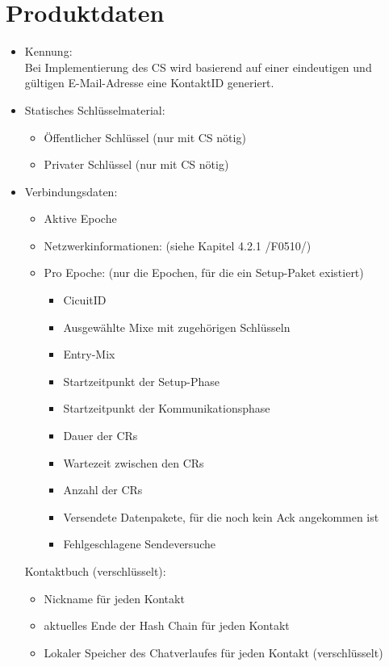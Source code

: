 \section{Produktdaten}
\begin{itemize}
	
	\item Kennung:\\
		Bei Implementierung des \ac{CS} wird basierend auf einer eindeutigen und gültigen E-Mail-Adresse eine KontaktID generiert.
	\item Statisches Schlüsselmaterial:  
	\begin{itemize}
		\item Öffentlicher Schlüssel	(nur mit \ac{CS} nötig)
		\item Privater Schlüssel		(nur mit \ac{CS} nötig)
	\end{itemize}
	\item Verbindungsdaten:
	\begin{itemize}
		\item Aktive Epoche
		\item Netzwerkinformationen:	(siehe Kapitel 4.2.1 /F0510/)
		\item Pro Epoche:	(nur die Epochen, für die ein Setup-Paket existiert)
		\begin{itemize}
			\item CicuitID
			\item Ausgewählte Mixe mit zugehörigen Schlüsseln
			\item Entry-Mix
			\item Startzeitpunkt der Setup-Phase
			\item Startzeitpunkt der Kommunikationsphase
			\item Dauer der \acp{CR}
			\item Wartezeit zwischen den \acp{CR}
			\item Anzahl der \acp{CR}
			\item Versendete Datenpakete, für die noch kein Ack angekommen ist
			\item Fehlgeschlagene Sendeversuche
		\end{itemize}
	\end{itemize}
	Kontaktbuch (verschlüsselt):
	\begin{itemize}
		\item Nickname für jeden Kontakt
		\item aktuelles Ende der Hash Chain für jeden Kontakt
		\item Lokaler Speicher des Chatverlaufes für jeden Kontakt
		(verschlüsselt)
	\end{itemize}



\end{itemize}
